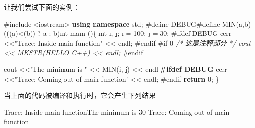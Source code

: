 \documentclass[
]{article}
\newenvironment{Shaded}{}{}
\newcommand{\CommentTok}[1]{\textcolor[rgb]{0.38,0.63,0.69}{\textit{#1}}}
\newcommand{\ControlFlowTok}[1]{\textcolor[rgb]{0.00,0.44,0.13}{\textbf{#1}}}
\newcommand{\DataTypeTok}[1]{\textcolor[rgb]{0.56,0.13,0.00}{#1}}
\newcommand{\DecValTok}[1]{\textcolor[rgb]{0.25,0.63,0.44}{#1}}
\newcommand{\ErrorTok}[1]{\textcolor[rgb]{1.00,0.00,0.00}{\textbf{#1}}}
\newcommand{\ImportTok}[1]{#1}
\newcommand{\KeywordTok}[1]{\textcolor[rgb]{0.00,0.44,0.13}{\textbf{#1}}}
\newcommand{\NormalTok}[1]{#1}
\newcommand{\OperatorTok}[1]{\textcolor[rgb]{0.40,0.40,0.40}{#1}}
\newcommand{\PreprocessorTok}[1]{\textcolor[rgb]{0.74,0.48,0.00}{#1}}
\newcommand{\StringTok}[1]{\textcolor[rgb]{0.25,0.44,0.63}{#1}}
\begin{document}
让我们尝试下面的实例：

\begin{Shaded}
\begin{Highlighting}[]
\PreprocessorTok{\#include }\ImportTok{\textless{}iostream\textgreater{}}
\KeywordTok{using} \KeywordTok{namespace}\NormalTok{ std}\OperatorTok{;}
\PreprocessorTok{\#define DEBUG\#}\NormalTok{define}\PreprocessorTok{ }\NormalTok{MIN}\OperatorTok{(}\NormalTok{a}\OperatorTok{,}\NormalTok{b}\OperatorTok{)}\PreprocessorTok{ }\OperatorTok{(((}\NormalTok{a}\OperatorTok{)\textless{}(}\NormalTok{b}\OperatorTok{))}\PreprocessorTok{ }\OperatorTok{?}\PreprocessorTok{ }\NormalTok{a}\PreprocessorTok{ }\OperatorTok{:}\PreprocessorTok{ }\NormalTok{b}\OperatorTok{)}\DataTypeTok{int}\PreprocessorTok{ }\NormalTok{main}\PreprocessorTok{ }\OperatorTok{()\{}
   \DataTypeTok{int}\NormalTok{ i}\OperatorTok{,}\NormalTok{ j}\OperatorTok{;}
\NormalTok{   i }\OperatorTok{=} \DecValTok{100}\OperatorTok{;}
\NormalTok{   j }\OperatorTok{=} \DecValTok{30}\OperatorTok{;}
   \PreprocessorTok{\#ifdef DEBUG}
\NormalTok{      cerr }\OperatorTok{\textless{}\textless{}}\StringTok{"Trace: Inside main function"} \OperatorTok{\textless{}\textless{}}\NormalTok{ endl}\OperatorTok{;}
   \PreprocessorTok{\#endif}
   \PreprocessorTok{\#if 0}
\CommentTok{      /* 这是注释部分 */}
\CommentTok{      cout \textless{}\textless{} MKSTR(HELLO C++) \textless{}\textless{} endl;}
\CommentTok{   }\PreprocessorTok{\#endif}

\NormalTok{   cout }\OperatorTok{\textless{}\textless{}}\StringTok{"The minimum is "} \OperatorTok{\textless{}\textless{}}\NormalTok{ MIN}\OperatorTok{(}\NormalTok{i}\OperatorTok{,}\NormalTok{ j}\OperatorTok{)} \OperatorTok{\textless{}\textless{}}\NormalTok{ endl}\OperatorTok{;}\ErrorTok{\#ifdef DEBUG}
\NormalTok{      cerr }\OperatorTok{\textless{}\textless{}}\StringTok{"Trace: Coming out of main function"} \OperatorTok{\textless{}\textless{}}\NormalTok{ endl}\OperatorTok{;}
   \PreprocessorTok{\#endif}
    \ControlFlowTok{return} \DecValTok{0}\OperatorTok{;}
\OperatorTok{\}}
\end{Highlighting}
\end{Shaded}

当上面的代码被编译和执行时，它会产生下列结果：

\begin{Shaded}
\begin{Highlighting}[]
\NormalTok{Trace}\OperatorTok{:}\NormalTok{ Inside main functionThe minimum is }\DecValTok{30}
\NormalTok{Trace}\OperatorTok{:}\NormalTok{ Coming out of main function}
\end{Highlighting}
\end{Shaded}
\end{document}
